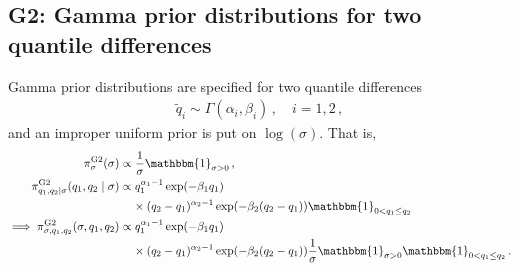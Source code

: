 \documentclass{article}
\begin{document}
\subsection{G2: Gamma prior distributions for two quantile differences}
\label{section:prior-g2}
%

%
Gamma prior distributions are specified for two quantile differences
%
\begin{align*}
	\tilde{q}_i \sim \Gamma(\alpha_i, \beta_i) \,, \quad i = 1, 2 \,,
\end{align*}
and an improper uniform prior is put on $\log(\sigma)$. That is,
%
\begin{align}
	\pi^{\text{G2}}_{\sigma}(\sigma)
		&\propto \frac{1}{\sigma} \mathbbm{1}_{\sigma > 0} \,, \nonumber \\
	\pi^{\text{G2}}_{q_1, q_2 \mid \sigma}(q_{1}, q_{2} \mid \sigma)
		&\propto q_{1} ^ {\alpha_1 - 1} \exp(-\beta_1 q_{1}) \nonumber \\
	&\phantom{=}\ \times (q_{2} - q_{1}) ^ {\alpha_2 - 1}
		\exp(-\beta_2 (q_2 - q_{1}))
		\mathbbm{1}_{0 <q_1 \leq q_2} \nonumber \\
	\implies \pi^{\text{G2}}_{\sigma, q_1, q_2}(\sigma, q_1, q_2)
		&\propto q_{1} ^ {\alpha_1 - 1} \exp(-\beta_1 q_{1}) \nonumber \\
	&\phantom{=}\ \times (q_{2} - q_{1}) ^ {\alpha_2 - 1}
		\exp(-\beta_2(q_2 - q_{1})) \frac{1}{\sigma} \mathbbm{1}_{\sigma > 0}
		\mathbbm{1}_{0 < q_1 \leq q_2} \,.
	\label{eq:g2-q}
\end{align}
%
\end{document}
